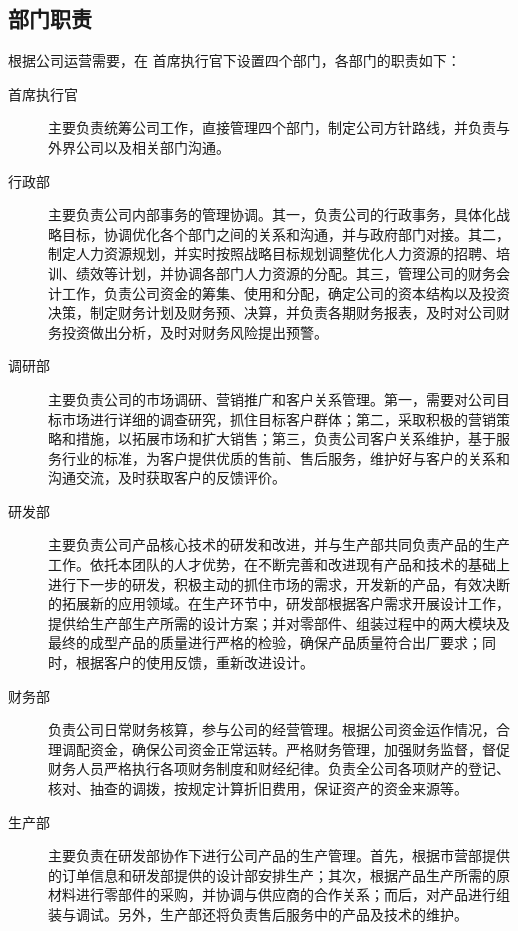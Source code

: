 \documentclass[violet]{main}
\begin{document}
			\subsection{部门职责}
				根据公司运营需要，在 首席执行官下设置四个部门，各部门的职责如下：
				\begin{description}
					\item[首席执行官]主要负责统筹公司工作，直接管理四个部门，制定公司方针路线，并负责与外界公司以及相关部门沟通。
					\item[行政部]主要负责公司内部事务的管理协调。其一，负责公司的行政事务，具体化战略目标，协调优化各个部门之间的关系和沟通，并与政府部门对接。其二，制定人力资源规划，并实时按照战略目标规划调整优化人力资源的招聘、培训、绩效等计划，并协调各部门人力资源的分配。其三，管理公司的财务会计工作，负责公司资金的筹集、使用和分配，确定公司的资本结构以及投资决策，制定财务计划及财务预、决算，并负责各期财务报表，及时对公司财务投资做出分析，及时对财务风险提出预警。
					\item[调研部]主要负责公司的市场调研、营销推广和客户关系管理。第一，需要对公司目标市场进行详细的调查研究，抓住目标客户群体；第二，采取积极的营销策略和措施，以拓展市场和扩大销售；第三，负责公司客户关系维护，基于服务行业的标准，为客户提供优质的售前、售后服务，维护好与客户的关系和沟通交流，及时获取客户的反馈评价。
					\item[研发部]主要负责公司产品核心技术的研发和改进，并与生产部共同负责产品的生产工作。依托本团队的人才优势，在不断完善和改进现有产品和技术的基础上进行下一步的研发，积极主动的抓住市场的需求，开发新的产品，有效决断的拓展新的应用领域。在生产环节中，研发部根据客户需求开展设计工作，提供给生产部生产所需的设计方案；并对零部件、组装过程中的两大模块及最终的成型产品的质量进行严格的检验，确保产品质量符合出厂要求；同时，根据客户的使用反馈，重新改进设计。
					\item[财务部]负责公司日常财务核算，参与公司的经营管理。根据公司资金运作情况，合理调配资金，确保公司资金正常运转。严格财务管理，加强财务监督，督促财务人员严格执行各项财务制度和财经纪律。负责全公司各项财产的登记、核对、抽查的调拨，按规定计算折旧费用，保证资产的资金来源等。
					\item[生产部]主要负责在研发部协作下进行公司产品的生产管理。首先，根据市营部提供的订单信息和研发部提供的设计部安排生产；其次，根据产品生产所需的原材料进行零部件的采购，并协调与供应商的合作关系；而后，对产品进行组装与调试。另外，生产部还将负责售后服务中的产品及技术的维护。
				\end{description}
\end{document}
